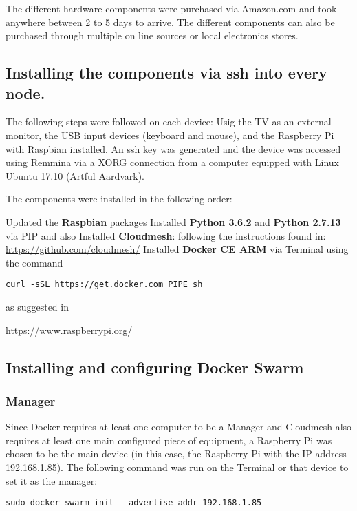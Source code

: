The different hardware components were purchased via Amazon.com and
took anywhere between 2 to 5 days to arrive. The different components
can also be purchased through multiple on line sources or local
electronics stores.
		
\subsection{Installing the components via ssh into every node.}
	
The following steps were followed on each device: Usig the TV as an
external monitor, the USB input devices (keyboard and mouse), and the
Raspberry Pi with Raspbian installed. An ssh key was generated and the
device was accessed using Remmina via a XORG connection from a
computer equipped with Linux Ubuntu 17.10 (Artful Aardvark).
  
The components were installed in the following order:


Updated the \textbf{Raspbian} packages \textbf{\textit{}} Installed
\textbf{Python 3.6.2} and \textbf{Python 2.7.13} via PIP and also
Installed \textbf{Cloudmesh}: following the instructions found in:
\url{https://github.com/cloudmesh/} Installed
\textbf{Docker CE ARM} via Terminal using the command

\verb|curl -sSL https://get.docker.com PIPE sh|

 as suggested
in

\url{https://www.raspberrypi.org/}

	
\subsection{Installing and configuring Docker Swarm}
  
\subsubsection{Manager}

Since Docker requires at least one computer to be a Manager and
Cloudmesh also requires at least one main configured piece of
equipment, a Raspberry Pi was chosen to be the main device (in this
case, the Raspberry Pi with the IP address 192.168.1.85).  The
following command was run on the Terminal or that device to set it as
the manager: 

\verb|sudo docker swarm init --advertise-addr 192.168.1.85|
	
